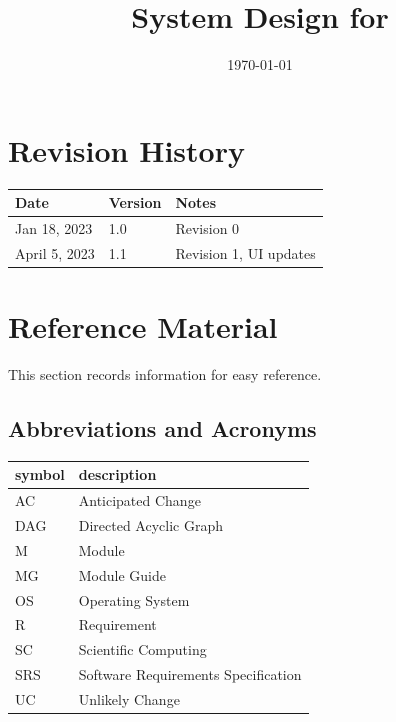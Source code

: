\documentclass[12pt, titlepage]{article}
\begin{document}
\title{System Design for \progname{}} 
\author{\authname}
\date{\today}

\maketitle


\section{Revision History}

\begin{tabularx}{\textwidth}{p{3cm}p{2cm}X}
\toprule {\bf Date} & {\bf Version} & {\bf Notes}\\
\midrule
Jan 18, 2023 & 1.0 & Revision 0\\
April 5, 2023 & 1.1 & Revision 1, UI updates\\
\bottomrule
\end{tabularx}

\newpage

\section{Reference Material}

This section records information for easy reference.

\subsection{Abbreviations and Acronyms}

\renewcommand{\arraystretch}{1.2}
\begin{tabular}{l l} 
    \toprule		
    \textbf{symbol} & \textbf{description}\\
    \midrule 
    AC & Anticipated Change\\
    DAG & Directed Acyclic Graph \\
    M & Module \\
    MG & Module Guide \\
    OS & Operating System \\
    R & Requirement\\
    SC & Scientific Computing \\
    SRS & Software Requirements Specification\\
    UC & Unlikely Change \\
    \bottomrule
  \end{tabular}\\
\end{document}
